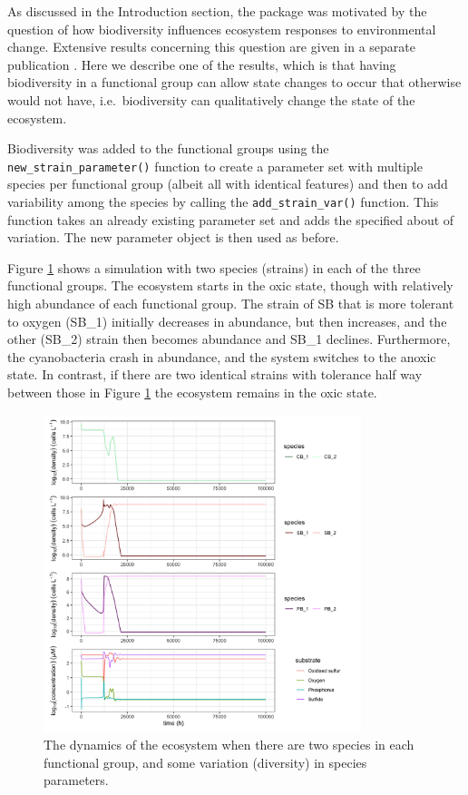 \documentclass[]{elsarticle} %
\begin{document}
As discussed in the Introduction section, the package was motivated by the question of how biodiversity influences ecosystem responses to environmental change. Extensive results concerning this question are given in a separate publication \citet{Limberger2023}. Here we describe one of the results, which is that having biodiversity in a functional group can allow state changes to occur that otherwise would not have, i.e.~biodiversity can qualitatively change the state of the ecosystem.

Biodiversity was added to the functional groups using the \texttt{new\_strain\_parameter()} function to create a parameter set with multiple species per functional group (albeit all with identical features) and then to add variability among the species by calling the \texttt{add\_strain\_var()} function. This function takes an already existing parameter set and adds the specified about of variation. The new parameter object is then used as before.

Figure \ref{fig:uc3} shows a simulation with two species (strains) in each of the three functional groups. The ecosystem starts in the oxic state, though with relatively high abundance of each functional group. The strain of SB that is more tolerant to oxygen (SB\_1) initially decreases in abundance, but then increases, and the other (SB\_2) strain then becomes abundance and SB\_1 declines. Furthermore, the cyanobacteria crash in abundance, and the system switches to the anoxic state. In contrast, if there are two identical strains with tolerance half way between those in Figure \ref{fig:uc3} the ecosystem remains in the oxic state.

\begin{figure}

{\centering \includegraphics[width=350px]{figures/uc3_supplement_5_4} 

}

\caption{The dynamics of the ecosystem when there are two species in each functional group, and some variation (diversity) in species parameters.}\label{fig:uc3}
\end{figure}
\end{document}

